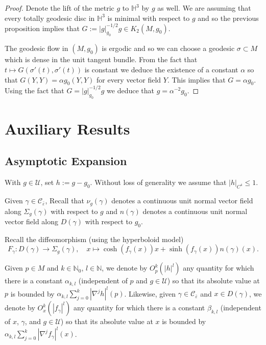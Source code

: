 \documentclass[11pt]{amsart}
\def\H{\mathbb H}
\def\N{\mathbb N}
\theoremstyle{remark}
\theoremstyle{definition}
\begin{document}
{{\begin{proof}
		
		
		Denote the lift of the metric $g$ to $\H^3$ by $g$ as well. We are assuming that every totally geodesic disc in $\H^3$ is minimal with respect to $g$ and  so the previous proposition implies that  $G:=|g|_{g_0}^{-1/2}g\in  K_2(M,g_0)$.  
		
		The geodesic flow in $(M,g_0)$ is ergodic and so we can choose a geodesic $\sigma\subset M$ which is dense in the unit tangent bundle. From the fact that $t\mapsto G(\sigma'(t),\sigma'(t))$ is constant we deduce the existence of a constant $\alpha$ so that  $G(Y,Y)=\alpha g_0(Y,Y)$ for every vector  field $Y$. This implies that $G=\alpha g_0$. Using the fact that $G=|g|_{g_0}^{-1/2}g$ we deduce that $g=\alpha^{-2}g_0$.
		
		
		
	\end{proof}
	
	
	\appendix
	
	\section{Auxiliary Results}
	
	\subsection{Asymptotic Expansion}
	
	With $g\in \mathcal U$, set $h:=g-g_0$. Without loss of generality we assume that $|h|_{C^4}\leq 1$.  
	
	Given $\gamma\in \mathcal C_{\bar \varepsilon}$, Recall that $\nu_g(\gamma)$ denotes a  continuous unit normal vector field along $\Sigma_g(\gamma)$ with respect to $g$ and $n(\gamma)$ denotes a  continuous unit normal vector field along $D(\gamma)$ with respect to $g_0$.
	
	Recall the diffeomorphism (using the hyperboloid model)
	\begin{equation*}
		F_{\gamma}: D(\gamma)\rightarrow \Sigma_{g}(\gamma),\quad x\mapsto \cosh(f_{\gamma}(x))x+\sinh(f_{\gamma}(x))n(\gamma)(x).
	\end{equation*}
	
	
	
	Given $p\in M$ and $k\in \N_0$, $l\in \N$, we denote by $O_p^k(|h|^l)$ any quantity for which there is a constant $\alpha_{k,l}$ (independent of $p$ and $g\in \mathcal U$) so that its absolute value at $p$ is bounded by $\alpha_{k,l}\sum_{j=0}^k|\nabla^j h|^l(p)$.  Likewise, given $\gamma\in\mathcal C_{\bar \varepsilon}$ and $x\in D(\gamma)$, we denote  by $O_x^k(|f_{\gamma}|^l)$ any quantity for which there is a constant $\beta_{k,l}$ (independent of $x$, $\gamma$, and $g\in \mathcal U$) so that its absolute value at $x$ is bounded by $\alpha_{k,l}\sum_{j=0}^k|\nabla^j f_{\gamma}|^l(x)$. 
	
}}
\end{document}
